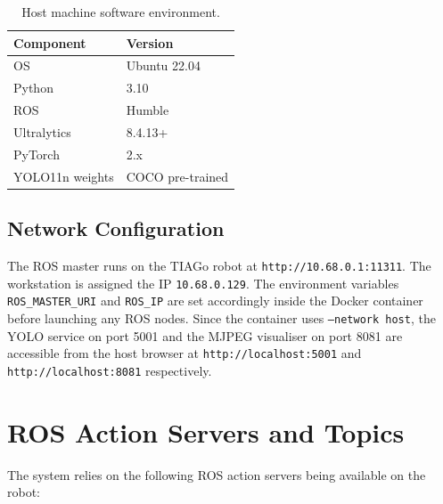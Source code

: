 \begin{table}[H]
\centering
\caption{Host machine software environment.}
\label{tab:host_env}
\begin{tabular}{ll}
\toprule
\textbf{Component} & \textbf{Version} \\
\midrule
OS                 & Ubuntu 22.04 \\
Python             & 3.10 \\
ROS                & Humble \\
Ultralytics        & 8.4.13+ \\
PyTorch            & 2.x \\
YOLO11n weights    & COCO pre-trained \\
\bottomrule
\end{tabular}
\end{table}

\subsection{Network Configuration}

The ROS master runs on the TIAGo robot at \texttt{http://10.68.0.1:11311}.
The workstation is assigned the IP \texttt{10.68.0.129}.
The environment variables \texttt{ROS\_MASTER\_URI} and \texttt{ROS\_IP} are set
accordingly inside the Docker container before launching any ROS nodes.
Since the container uses \texttt{--network host}, the YOLO service on port 5001 and
the MJPEG visualiser on port 8081 are accessible from the host browser at
\texttt{http://localhost:5001} and \texttt{http://localhost:8081} respectively.

\section{ROS Action Servers and Topics}

The system relies on the following ROS action servers being available on the robot:

